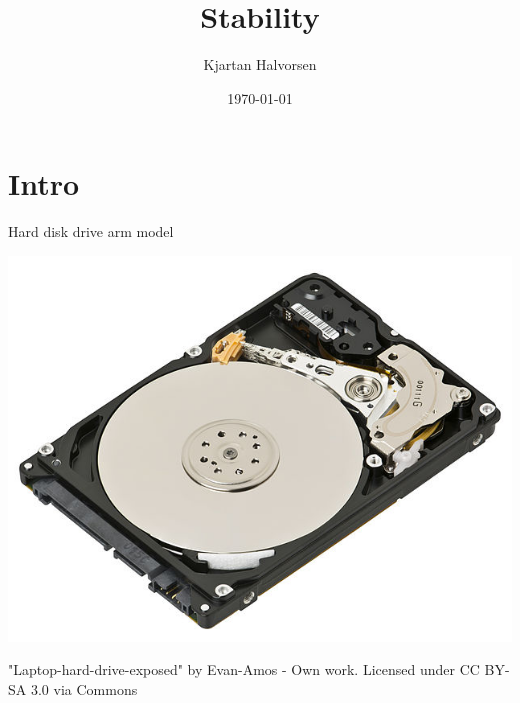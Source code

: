 \documentclass[presentation,aspectratio=169]{beamer}
\author{Kjartan Halvorsen}
\date{\today}
\title{Stability}
\begin{document}
\maketitle

\section{Intro}
\label{sec:orgf404d43}

\begin{frame}[label={sec:org3488c90}]{Hard disk drive arm model}
\begin{center}
\includegraphics[width=0.4\linewidth]{../../figures/diskdrive.png}
\end{center}

{\tiny "Laptop-hard-drive-exposed" by Evan-Amos - Own work. Licensed under CC BY-SA 3.0 via Commons } 
\end{frame}
\end{document}
